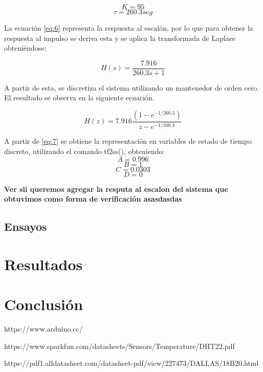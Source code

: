 \documentclass[journal]{IEEEtran}
\begin{document}
 \[K=95\]
 \[\tau=260.3 seg\]
 
 La ecuación \ref{eq:6} representa la respuesta al escalón, por lo que para obtener la respuesta al impulso se deriva esta y se aplica la transformada de Laplace obteniéndose: 
 
 \begin{equation}
H(s)=\frac{7.916}{260.3s+1 }
\label{eq:7}
\end{equation}

  A partir de esta, se discretiza el sistema utilizando un mantenedor de orden cero. El resultado se observa en la siguiente ecuación.
  
   \begin{equation}
H(z)=7.916\frac{(1-e^{-1/260.3})}{z-e^{-1/260.3}}
\label{eq:7}
\end{equation}

A partir de \ref{eq:7} se obtiene la representación en variables de estado de tiempo discreto, utilizando el comando tf2ss(), obteniendo: 
 \[A=0.996\]
 \[B=1\]
 \[C=0.0303\]
 \[D=0\]

\textbf{Ver sii queremos agregar la resputa al escalon del sistema que obtuvimos como forma de verificación asasdasdas}

\subsection{Ensayos}
   
\section{Resultados}
\section{Conclusión}


\vspace{1cm} 
\begin{thebibliography}{10}
https://www.arduino.cc/


https://www.sparkfun.com/datasheets/Sensors/Temperature/DHT22.pdf

https://pdf1.alldatasheet.com/datasheet-pdf/view/227473/DALLAS/18B20.html

\end{thebibliography}
\end{document}
